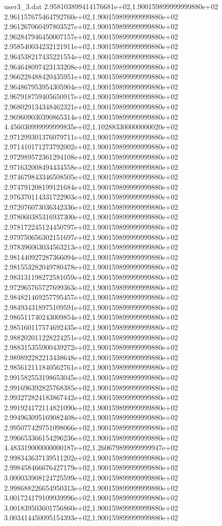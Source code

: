 \begin{filecontents}{user3_3.dat}
2.958103899414176681e+02,1.900159899999999880e+02
2.961157675464792760e+02,1.900159899999999880e+02
2.961267060497803527e+02,1.900159899999999880e+02
2.962847946450007157e+02,1.900159899999999880e+02
2.958540034232121911e+02,1.900159899999999880e+02
2.964538217435221554e+02,1.900159899999999880e+02
2.964648097423133208e+02,1.900159899999999880e+02
2.966228488420435951e+02,1.900159899999999880e+02
2.964867953954305904e+02,1.900159899999999880e+02
2.967918759405650917e+02,1.900159899999999880e+02
2.968029134348462321e+02,1.900159899999999880e+02
2.969609030390865314e+02,1.900159899999999880e+02
4.456030999999999835e+02,1.102883300000000020e+02
2.971299301376079711e+02,1.900159899999999880e+02
2.971410171273792002e+02,1.900159899999999880e+02
2.972989572361294108e+02,1.900159899999999880e+02
2.971632008494434558e+02,1.900159899999999880e+02
2.974679843346508505e+02,1.900159899999999880e+02
2.974791208199121684e+02,1.900159899999999880e+02
2.976370114331722903e+02,1.900159899999999880e+02
2.972076073036342336e+02,1.900159899999999880e+02
2.978060385316937300e+02,1.900159899999999880e+02
2.978172245124450797e+02,1.900159899999999880e+02
2.979750656302151697e+02,1.900159899999999880e+02
2.978396063034563213e+02,1.900159899999999880e+02
2.981440927287366094e+02,1.900159899999999880e+02
2.981553282049780478e+02,1.900159899999999880e+02
2.983131198272581059e+02,1.900159899999999880e+02
2.972965765727699363e+02,1.900159899999999880e+02
2.984821469257795457e+02,1.900159899999999880e+02
2.984934318975109591e+02,1.900159899999999880e+02
2.986511740243009854e+02,1.900159899999999880e+02
2.985160117574692435e+02,1.900159899999999880e+02
2.988202011228224251e+02,1.900159899999999880e+02
2.988315355900439272e+02,1.900159899999999880e+02
2.989892282213438648e+02,1.900159899999999880e+02
2.985612111840562761e+02,1.900159899999999880e+02
2.991582553198653045e+02,1.900159899999999880e+02
2.991696392825768385e+02,1.900159899999999880e+02
2.993272824183867442e+02,1.900159899999999880e+02
2.991924172114821090e+02,1.900159899999999880e+02
2.994963095169082408e+02,1.900159899999999880e+02
2.995077429751098066e+02,1.900159899999999880e+02
2.996653366154296236e+02,1.900159899999999880e+02
4.483319000000000187e+02,1.260679899999999947e+02
2.998343637139511202e+02,1.900159899999999880e+02
2.998458466676427179e+02,1.900159899999999880e+02
3.000033908124725599e+02,1.900159899999999880e+02
2.998688226654950313e+02,1.900159899999999880e+02
3.001724179109939996e+02,1.900159899999999880e+02
3.001839503601756860e+02,1.900159899999999880e+02
3.003414450095154393e+02,1.900159899999999880e+02

\end{filecontents}
